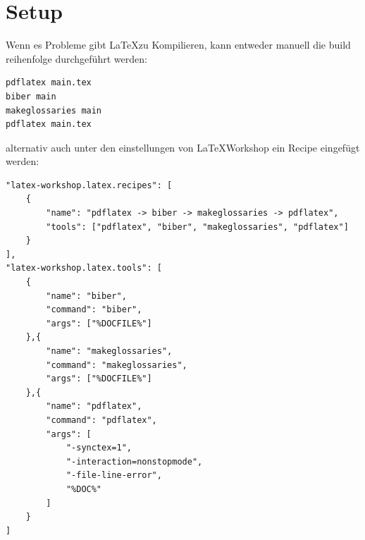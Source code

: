 \section{Setup}
\label{sec:setup}

Wenn es Probleme gibt \LaTeX zu Kompilieren, kann entweder manuell die build reihenfolge durchgeführt werden:

\begin{lstlisting}[caption=Manuelle ablauf vom Kompilieren]
pdflatex main.tex
biber main
makeglossaries main
pdflatex main.tex
\end{lstlisting}

alternativ auch unter den einstellungen von \LaTeX Workshop ein Recipe eingefügt werden:

\begin{lstlisting}[caption=Manuelle ablauf vom Kompilieren]
"latex-workshop.latex.recipes": [
    {
        "name": "pdflatex -> biber -> makeglossaries -> pdflatex",
        "tools": ["pdflatex", "biber", "makeglossaries", "pdflatex"]
    }
],
"latex-workshop.latex.tools": [
    {
        "name": "biber",
        "command": "biber",
        "args": ["%DOCFILE%"]
    },{
        "name": "makeglossaries",
        "command": "makeglossaries",
        "args": ["%DOCFILE%"]
    },{
        "name": "pdflatex",
        "command": "pdflatex",
        "args": [
            "-synctex=1",
            "-interaction=nonstopmode",
            "-file-line-error",
            "%DOC%"
        ]
    }
]
\end{lstlisting}